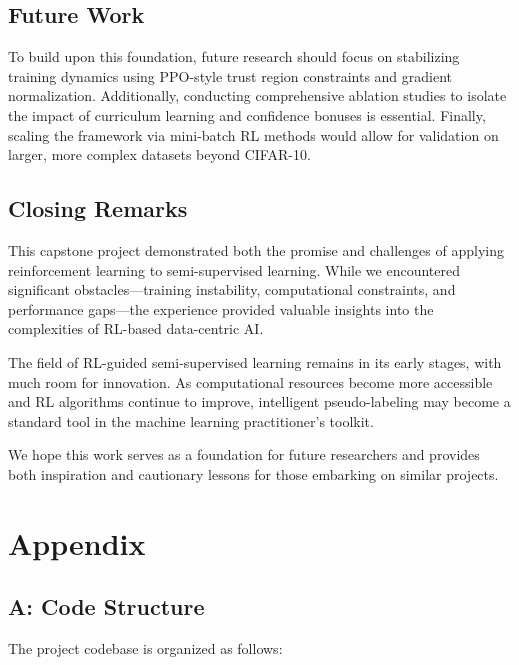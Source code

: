 \documentclass{scrartcl}
\begin{document}
\subsection{Future Work}
To build upon this foundation, future research should focus on stabilizing training dynamics using PPO-style trust region constraints and gradient normalization. Additionally, conducting comprehensive ablation studies to isolate the impact of curriculum learning and confidence bonuses is essential. Finally, scaling the framework via mini-batch RL methods would allow for validation on larger, more complex datasets beyond CIFAR-10.

\subsection{Closing Remarks}

This capstone project demonstrated both the promise and challenges of applying reinforcement learning to semi-supervised learning. While we encountered significant obstacles—training instability, computational constraints, and performance gaps—the experience provided valuable insights into the complexities of RL-based data-centric AI.

The field of RL-guided semi-supervised learning remains in its early stages, with much room for innovation. As computational resources become more accessible and RL algorithms continue to improve, intelligent pseudo-labeling may become a standard tool in the machine learning practitioner's toolkit.

We hope this work serves as a foundation for future researchers and provides both inspiration and cautionary lessons for those embarking on similar projects.





\newpage
\appendix
\section{Appendix}

\subsection{A: Code Structure}

The project codebase is organized as follows:
\end{document}
